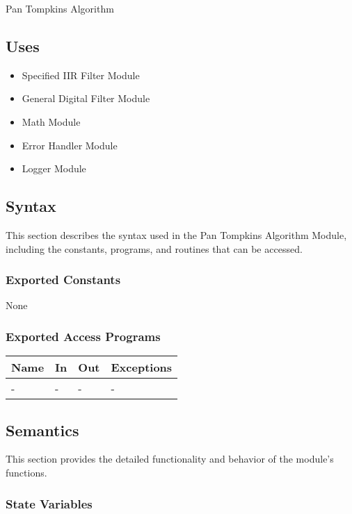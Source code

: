\documentclass[12pt, titlepage]{article}
\begin{document}
Pan Tompkins Algorithm

\subsection{Uses}

\begin{itemize}
\item Specified IIR Filter Module
\item General Digital Filter Module
\item Math Module
\item Error Handler Module
\item Logger Module
\end{itemize}

\subsection{Syntax}

This section describes the syntax used in the Pan Tompkins Algorithm Module,
including the constants, programs, and routines that can be accessed.

\subsubsection{Exported Constants}

None

\subsubsection{Exported Access Programs}

\begin{center}
\begin{tabular}{p{2cm} p{4cm} p{4cm} p{2cm}}
\hline
\textbf{Name} & \textbf{In} & \textbf{Out} & \textbf{Exceptions} \\
\hline
- & - & - & - \\
\hline
\end{tabular}
\end{center}

\subsection{Semantics}

This section provides the detailed functionality and behavior of the module’s
functions.

\subsubsection{State Variables}
\end{document}
